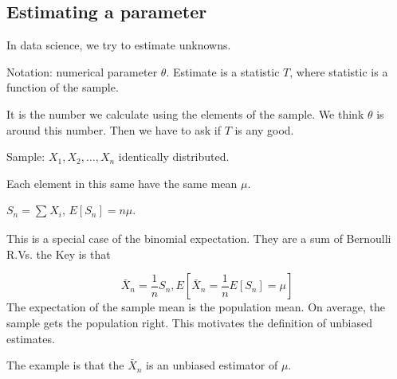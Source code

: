 \documentclass{report}
\begin{document}
\subsection{Estimating a parameter}
In data science, we try to estimate unknowns. 

Notation: numerical parameter $ \theta $. Estimate is a statistic $ T $, where statistic is a function of the sample.  

It is the number we calculate using the elements of the sample. We think $ \theta $ is around this number. Then we have to ask if $ T $ is any good. 

Sample: $ X_1, X_2, \dots, X_n $ identically distributed. 

Each element in this same have the same mean $ \mu $. 

$ S_n = \sum_{}^{}X_i$, $ E[S_n] = n\mu $. 

This is a special case of the binomial expectation. They are a sum of Bernoulli R.Vs. the Key is that 

\[
	\bar{X}_n = \frac{1}{n}S_n, E[\bar{X}_n = \frac{1}{n} E[S_n] = \mu]
\]
The expectation of the sample mean is the population mean. On average, the sample gets the population right. This motivates the definition of unbiased estimates. 


The example is that the $ \bar{X}_n $ is an unbiased estimator of $ \mu $. 
\end{document}
